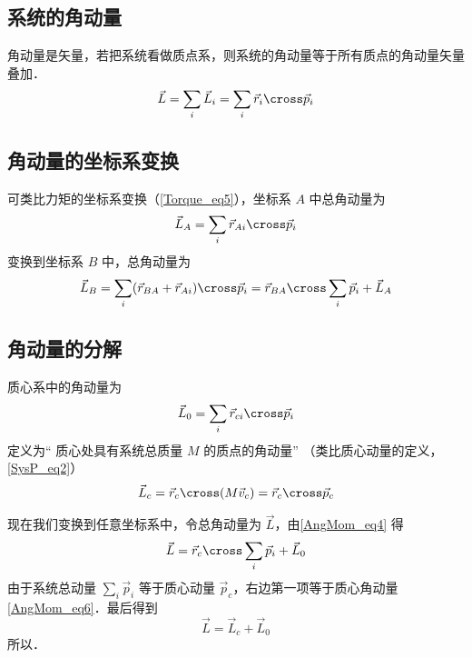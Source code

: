 

\subsection{系统的角动量}
角动量是矢量，若把系统看做质点系，则系统的角动量等于所有质点的角动量矢量叠加．
\begin{equation}
\vec L = \sum_i \vec L_i = \sum_i \vec r_i \cross\vec p_i
\end{equation}

\subsection{角动量的坐标系变换}
可类比力矩的坐标系变换（\autoref{Torque_eq5}），坐标系 $A$ 中总角动量为
\begin{equation}
\vec L_A = \sum_i \vec r_{Ai} \cross \vec p_i 
\end{equation}
变换到坐标系 $B$ 中，总角动量为
\begin{equation}\label{AngMom_eq4}
\vec L_B = \sum_i (\vec r_{BA} + \vec r_{Ai})\cross \vec p_i = \vec r_{BA}\cross \sum_i \vec p_i + \vec L_A
\end{equation}

\subsection{角动量的分解}
质心系中的角动量为
\begin{equation}\label{AngMom_eq5}
\vec L_0 = \sum_i \vec r_{ci} \cross \vec p_i
\end{equation}
定义为“ 质心处具有系统总质量 $M$ 的质点的角动量” （类比质心动量的定义， \autoref{SysP_eq2}）
\begin{equation}\label{AngMom_eq6}
\vec L_c  = \vec r_c \cross (M \vec v_c) = \vec r_c \cross \vec p_c
\end{equation}

现在我们变换到任意坐标系中，令总角动量为 $\vec L$，由\autoref{AngMom_eq4} 得
\begin{equation}
\vec L = \vec r_{c} \cross \sum_i \vec p_i + \vec L_0
\end{equation}
由于系统总动量 $\sum_i \vec p_i$ 等于质心动量 $\vec p_c$，右边第一项等于质心角动量\autoref{AngMom_eq6}．最后得到
\begin{equation}
\vec L = \vec L_c + \vec L_0
\end{equation}
所以．
